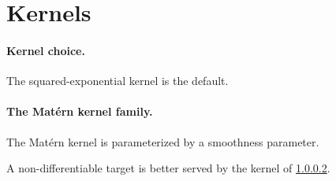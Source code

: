 \section{Kernels}

\paragraph{Kernel choice.} The squared-exponential kernel is the default.

\paragraph{The Mat\'ern kernel family.}\label{sec:matern} The Mat\'ern kernel is parameterized by a smoothness parameter.

A non-differentiable target is better served by the kernel of \cref{sec:matern}.
